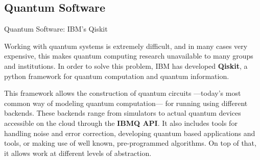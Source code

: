 \documentclass[9pt, handout, aspectratio=169]{beamer}		%
\begin{document}

	\subsection{Quantum Software}

	\begin{frame}{Quantum Software: IBM's Qiskit}

		\medskip

		Working with quantum systems is extremely difficult, and in many cases very expensive, this makes quantum computing research unavailable to many groups and institutions. In order to solve this problem, IBM has developed \textbf{Qiskit}, a python framework for quantum computation and quantum information.

		\begin{multicols}{2}

			This framework allows the construction of quantum circuits ---today's most common way of modeling quantum computation--- for running using different backends. These backends range from simulators to actual quantum devices accessible on the cloud through the \textbf{IBMQ API}. It also includes tools for handling noise and error correction, developing quantum based applications and tools, or making use of well known, pre-programmed algorithms. On top of that, it allows work at different levels of abstraction.

			\columnbreak


\end{multicols}
\end{frame}
\end{document}
